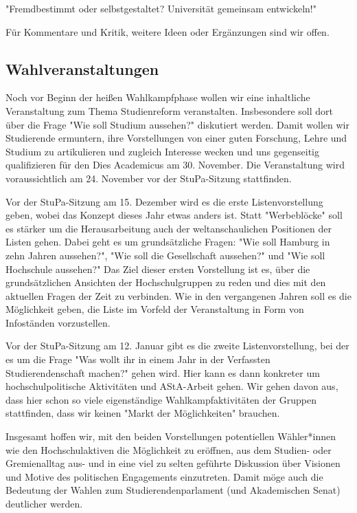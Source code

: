 \documentclass[ngerman,headheight=70pt]{scrartcl}
\begin{document}
    "Fremdbestimmt oder selbstgestaltet? Universität gemeinsam entwickeln!"

    Für Kommentare und Kritik, weitere Ideen oder Ergänzungen sind wir offen.

    \subsection{Wahlveranstaltungen}
    Noch vor Beginn der heißen Wahlkampfphase wollen wir eine inhaltliche
    Veranstaltung zum Thema Studienreform veranstalten. Insbesondere soll dort
    über die Frage "Wie soll Studium aussehen?" diskutiert werden. Damit wollen
    wir Studierende ermuntern, ihre Vorstellungen von einer guten Forschung,
    Lehre und Studium zu artikulieren und zugleich Interesse wecken und uns
    gegenseitig qualifizieren für den Dies Academicus am 30. November. Die
    Veranstaltung wird voraussichtlich am 24. November vor der StuPa-Sitzung
    stattfinden.

    Vor der StuPa-Sitzung am 15. Dezember wird es die erste Listenvorstellung
    geben, wobei das Konzept dieses Jahr etwas anders ist. Statt "Werbeblöcke"
    soll es stärker um die Herausarbeitung auch der weltanschaulichen Positionen
    der Listen gehen. Dabei geht es um grundsätzliche Fragen: "Wie soll Hamburg
    in zehn Jahren aussehen?", "Wie soll die Gesellschaft aussehen?" und "Wie
    soll Hochschule aussehen?" Das Ziel dieser ersten Vorstellung ist es, über
    die grundsätzlichen Ansichten der Hochschulgruppen zu reden und dies mit
    den aktuellen Fragen der Zeit zu verbinden.
    Wie in den vergangenen Jahren soll es die Möglichkeit geben, die Liste im
    Vorfeld der Veranstaltung in Form von Infoständen vorzustellen.

    Vor der StuPa-Sitzung am 12. Januar gibt es die zweite Listenvorstellung,
    bei der es um die Frage "Was wollt ihr in einem Jahr in der Verfassten
    Studierendenschaft machen?" gehen wird. Hier kann es dann konkreter um
     hochschulpolitische Aktivitäten und AStA-Arbeit gehen.
    Wir gehen davon aus, dass hier schon so viele eigenständige
    Wahlkampfaktivitäten der Gruppen stattfinden, dass wir keinen "Markt der
    Möglichkeiten" brauchen.

    Insgesamt hoffen wir, mit den beiden Vorstellungen potentiellen Wähler*innen
    wie den Hochschulaktiven die Möglichkeit zu eröffnen, aus dem Studien- oder
    Gremienalltag aus- und in eine viel zu selten geführte Diskussion über
    Visionen und Motive des politischen Engagements einzutreten. Damit möge auch
    die Bedeutung der Wahlen zum Studierendenparlament (und Akademischen Senat)
    deutlicher werden.
\end{document}
